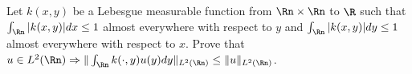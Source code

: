 Let $k(x,y)$ be a Lebesgue measurable function from $\Rn\times \Rn$ to
$\R$ such that $\int_{\Rn}|k(x,y)|dx\leq 1$ almost everywhere with
respect to $y$ and $\int_{\Rn}|k(x,y)|dy\leq 1$ almost everywhere with
respect to $x$. Prove that $u\in L^2(\Rn) \Rightarrow \| \int_{\Rn}
k(\cdot ,y) u(y)dy\|_{L^2(\Rn)}\leq \|u\|_{L^2(\Rn)}$.

